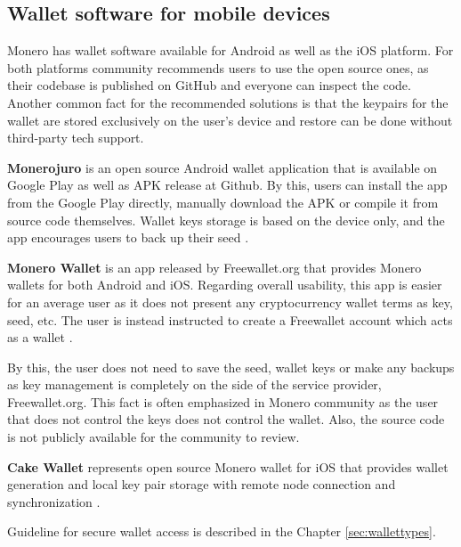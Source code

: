 \documentclass[
  printed, %
  table,   %
  lof,     %
  lot,     %
           oneside, color
]{fithesis3}
\begin{document}
\subsection{Wallet software for mobile devices}

Monero has wallet software available for Android as well as the iOS platform. For both platforms community recommends users to use the open source ones, as their codebase is published on GitHub and everyone can inspect the code. Another common fact for the recommended solutions is that the keypairs for the wallet are stored exclusively on the user's device and restore can be done without third-party tech support.

\textbf{Monerojuro} is an open source Android wallet application that is available on Google Play as well as APK release at Github. By this, users can install the app from the Google Play directly, manually download the APK or compile it from source code themselves. Wallet keys storage is based on the device only, and the app encourages users to back up their seed \cite{xmrwalletgithub}.

\textbf{Monero Wallet} is an app released by Freewallet.org that provides Monero wallets for both Android and iOS. Regarding overall usability, this app is easier for an average user as it does not present any cryptocurrency wallet terms as key, seed, etc. The user is instead instructed to create a Freewallet account which acts as a wallet \cite{freewallet}. 

By this, the user does not need to save the seed, wallet keys or make any backups as key management is completely on the side of the service provider, Freewallet.org. This fact is often emphasized in Monero community as the user that does not control the keys does not control the wallet. Also, the source code is not publicly available for the community to review.

\textbf{Cake Wallet} represents open source Monero wallet for iOS that provides wallet generation and local key pair storage with remote node connection and synchronization \cite{cakewalletgithub}.

Guideline for secure wallet access is described in the Chapter \ref{sec:wallettypes}. 
\end{document}
